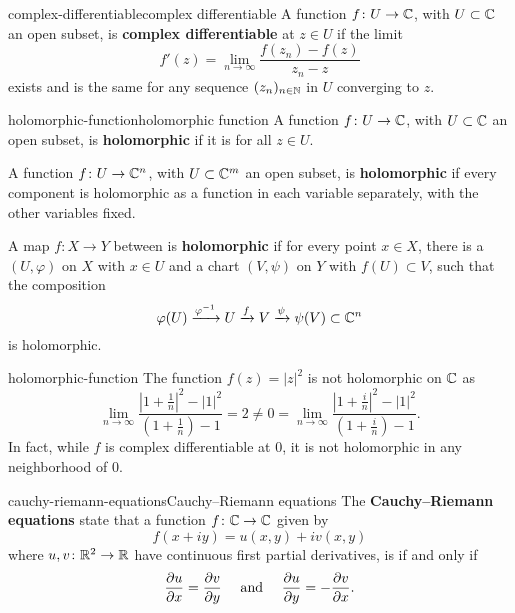 \begin{topic}{complex-differentiable}{complex differentiable}
    A function $f \colon U \to \mathbb{C}$, with $U \subset \mathbb{C}$ an open subset, is \textbf{complex differentiable} at $z \in U$ if the limit
    \[ f'(z) = \lim_{n \to \infty} \frac{f(z_n) - f(z)}{z_n - z} \]
    exists and is the same for any sequence $(z_n)_{n \in \mathbb{N}}$ in $U$ converging to $z$.
\end{topic}

\begin{topic}{holomorphic-function}{holomorphic function}
    A function $f \colon U \to \mathbb{C}$, with $U \subset \mathbb{C}$ an open subset, is \textbf{holomorphic} if it is  for all $z \in U$.
    
    A function $f \colon U \to \mathbb{C}^n$, with $U \subset \mathbb{C}^m$ an open subset, is \textbf{holomorphic} if every component is holomorphic as a function in each variable separately, with the other variables fixed.
    
    A map $f \colon X \to Y$ between  is \textbf{holomorphic} if for every point $x \in X$, there is a  $(U, \varphi)$ on $X$ with $x \in U$ and a chart $(V, \psi)$ on $Y$ with $f(U) \subset V$, such that the composition
    \[ \varphi(U) \xrightarrow{\varphi^{-1}} U \xrightarrow{f} V \xrightarrow{\psi} \psi(V) \subset \mathbb{C}^n \]
    is holomorphic.
\end{topic}

\begin{example}{holomorphic-function}
    The function $f(z) = |z|^2$ is not holomorphic on $\mathbb{C}$ as
    \[ \lim_{n \to \infty} \frac{|1 + \tfrac{1}{n}|^2 - |1|^2}{(1 + \tfrac{1}{n}) - 1} = 2 \ne 0 = \lim_{n \to \infty} \frac{|1 + \tfrac{i}{n}|^2 - |1|^2}{(1 + \tfrac{i}{n}) - 1} . \]
    In fact, while $f$ is complex differentiable at $0$, it is not holomorphic in any neighborhood of $0$.
\end{example}

\begin{topic}{cauchy-riemann-equations}{Cauchy--Riemann equations}
    The \textbf{Cauchy--Riemann equations} state that a function $f \colon \mathbb{C} \to \mathbb{C}$ given by
    \[ f(x + iy) = u(x, y) + i v(x, y) \]
    where $u, v \colon \mathbb{R}^2 \to \mathbb{R}$ have continuous first partial derivatives, is  if and only if
    \[ \frac{\partial u}{\partial x} = \frac{\partial v}{\partial y} \quad \textup{ and } \quad \frac{\partial u}{\partial y} = - \frac{\partial v}{\partial x} . \]
\end{topic}

